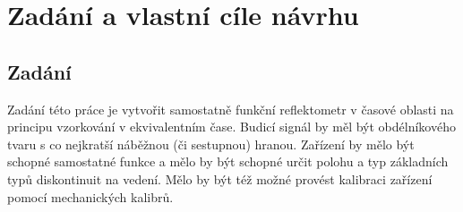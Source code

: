 \chapter{Zadání a vlastní cíle návrhu}

\section{Zadání}
Zadání této práce je vytvořit samostatně funkční reflektometr v časové oblasti na principu vzorkování v ekvivalentním čase. Budicí signál by měl být obdélníkového tvaru s co nejkratší náběžnou (či sestupnou) hranou. Zařízení by mělo být schopné samostatné funkce a mělo by být schopné určit polohu a typ základních typů diskontinuit na vedení. Mělo by být též možné provést kalibraci zařízení pomocí mechanických kalibrů.

